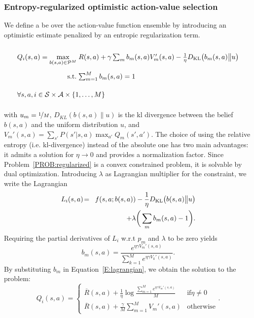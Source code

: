 \subsubsection{Entropy-regularized optimistic action-value selection}
We define a \gls{be} over the action-value function ensemble by introducing an optimistic estimate penalized by an entropic regularization term.
\begin{probdef}
\begin{equation}
\arraycolsep=1.4pt\def\arraystretch{2.2}
\begin{array}{rrclcl}
\displaystyle Q_i(s,a) = \max_{b(s,a) \in \mathcal{P}^M} & \multicolumn{3}{l}{R(s,a) + \gamma \sum_m{b}_m(s,a)V_m'(s,a)-\frac{1}{\eta}D_{\mathrm{KL}}\big(b_m(s,a)\big{\|}u\big) } \\
\textrm{s.t.} & \sum_{m=1}^{M} b_m(s,a) & = & 1 \\
\multicolumn{4}{l}{ \forall s,a,i \in \mathcal{S} \times \mathcal{A} \times \{1,\dots,M\}}
\end{array}\nonumber
\end{equation}\label{PROB:regularized}
\end{probdef}
\noindent with $u_m  =  \nicefrac{1}{M}$, $D_{KL}(b(s,a)\| u)$ is the \gls{kl} divergence between the belief $b(s,a)$ and the uniform distribution $u$, and $V_m'(s,a) \! = \! \sum_{s'} P(s'|s,a)\max_{a'}Q_m(s',a')$.
The choice of using the relative entropy (i.e. \gls{kl}-divergence) instead of the absolute one has two main advantages: it admits a solution for $\eta \to 0$ and provides a normalization factor.
Since Problem~\ref{PROB:regularized} is a convex constrained problem, it is solvable by dual optimization. Introducing $\lambda$ as Lagrangian multiplier for the constraint, we write the Lagrangian
\begin{eqnarray}
L_i(s,a) \!&=& \!f(s,a; b(s,a)) -\frac{1}{\eta}D_{\mathrm{KL}}\big(b(s,a)\big{\|}u\big)\nonumber \\ && + \lambda\bigg(\sum_m b_m(s,a) - 1\bigg).\label{E:lagrangian}
\end{eqnarray}
Requiring the partial derivatives of $L_i$ w.r.t $p_m$ and $\lambda$ to be zero yields 
\begin{equation}
b_m(s,a) = \frac{e^{\eta  \gamma V_m'(s,a)}}{\sum_{k=1}^{M} e^{\eta \gamma   V_k'(s,a)}}\label{pm}.
\end{equation} 
By substituting $b_m$ in Equation~\ref{E:lagrangian}, we obtain the solution to the problem:
\begin{equation}
Q_i(s,a) = \begin{cases}
\overline{R}(s,a) + \frac{1}{\eta} \log \frac{\sum_{m=1}^Me^{\eta \gamma  V_m'(s,a) }}{M} & \mathrm{if} \eta \neq 0 \label{OBE} \\
\overline{R}(s,a) + \frac{\gamma}M \sum_{m=1}^{M} V_m'(s,a) & \mathrm{otherwise}
\end{cases}.
\end{equation}
